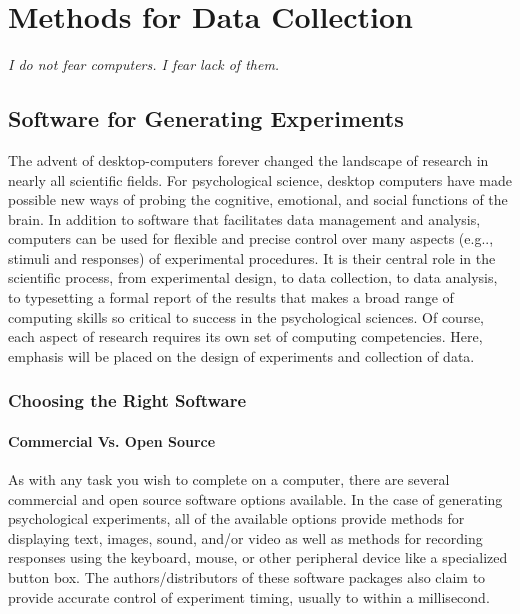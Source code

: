 \chapter{Methods for Data Collection}

\epigraph{\textit{I do not fear computers. I fear lack of them.}}{}

\minitoc
\newpage
\section{Software for Generating Experiments}
The advent of desktop-computers forever changed the landscape of research in nearly all scientific fields.  For psychological science, desktop computers have made possible new ways of probing the cognitive, emotional, and social functions of the brain. In addition to software that facilitates data management and analysis, computers can be used for flexible and precise control over many aspects (e.g.., stimuli and responses) of experimental procedures. It is their central role in the scientific process, from experimental design, to data collection, to data analysis, to typesetting a formal report of the results that makes a broad range of computing skills so critical to success in the psychological sciences. Of course, each aspect of research requires its own set of computing competencies. Here, emphasis will be placed on the design of experiments and collection of data. 

\subsection{Choosing the Right Software}
\subsubsection{Commercial Vs. Open Source}
As with any task you wish to complete on a computer, there are several commercial and \gls{open source software} options available. In the case of generating psychological experiments, all of the available options provide methods for displaying text, images, sound, and/or video as well as methods for recording responses using the keyboard, mouse, or other peripheral device like a specialized button box.  The authors/distributors of these software packages also claim to provide accurate control of experiment timing, usually to within a millisecond. 

